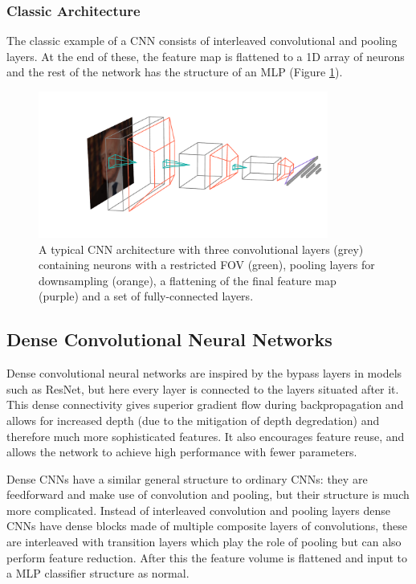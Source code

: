 \subsubsection{Classic Architecture}
The classic example of a CNN \cite{CS231n} consists of interleaved convolutional and pooling layers. At the end of these, the feature map is flattened to a 1D array of neurons and the rest of the network has the structure of an MLP (Figure \ref{fig:machine_learning:classic_CNN}). 
\begin{figure}[h!]
    \includegraphics[width=0.85\textwidth]{figures/machine_learning/convnet_arch.pdf}
    \caption{A typical CNN architecture with three convolutional layers (grey) containing neurons with a restricted FOV (green), pooling layers for downsampling (orange), a flattening of the final feature map (purple) and a set of fully-connected layers.}
        \label{fig:machine_learning:classic_CNN}
\end{figure}


\subsection{Dense Convolutional Neural Networks}
Dense convolutional neural networks \cite{DenseNet} are inspired by the bypass layers in models such as  ResNet, but here every layer is connected to the layers situated after it. 
This dense connectivity gives superior gradient flow during backpropagation and allows for increased depth (due to the mitigation of depth degredation) and therefore much more sophisticated features. It also encourages feature reuse, and allows the network to achieve high performance with fewer parameters. 

Dense CNNs have a similar general structure to ordinary CNNs: they are feedforward and make use of convolution and pooling, but their structure is much more complicated. 
Instead of interleaved convolution and pooling layers dense CNNs have dense blocks made of multiple composite layers of convolutions, these are interleaved with transition layers which play the role of pooling but can also perform feature reduction. After this the feature volume is flattened and input to a MLP classifier structure as normal. 

